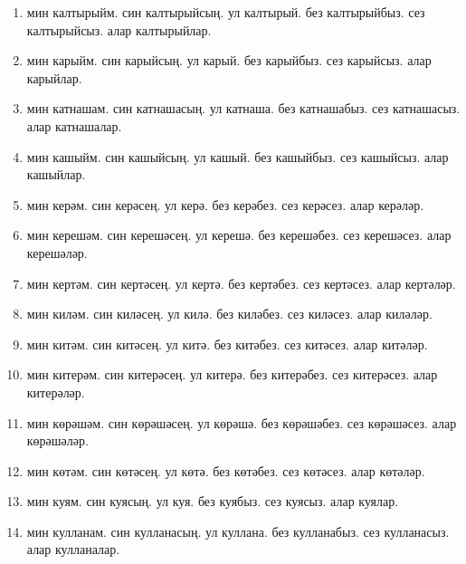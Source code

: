\documentclass{article}
\begin{document}
\begin{enumerate}
    \item
    мин калтырыйм.
    син калтырыйсың.
    ул калтырый.
    без калтырыйбыз.
    сез калтырыйсыз.
    алар калтырыйлар.

    \item
    мин карыйм.
    син карыйсың.
    ул карый.
    без карыйбыз.
    сез карыйсыз.
    алар карыйлар.

    \item
    мин катнашам.
    син катнашасың.
    ул катнаша.
    без катнашабыз.
    сез катнашасыз.
    алар катнашалар.

    \item
    мин кашыйм.
    син кашыйсың.
    ул кашый.
    без кашыйбыз.
    сез кашыйсыз.
    алар кашыйлар.

    \item
    мин керәм.
    син керәсең.
    ул керә.
    без керәбез.
    сез керәсез.
    алар керәләр.

    \item
    мин керешәм.
    син керешәсең.
    ул керешә.
    без керешәбез.
    сез керешәсез.
    алар керешәләр.

    \item
    мин кертәм.
    син кертәсең.
    ул кертә.
    без кертәбез.
    сез кертәсез.
    алар кертәләр.

    \item
    мин киләм.
    син киләсең.
    ул килә.
    без киләбез.
    сез киләсез.
    алар киләләр.

    \item
    мин китәм.
    син китәсең.
    ул китә.
    без китәбез.
    сез китәсез.
    алар китәләр.

    \item
    мин китерәм.
    син китерәсең.
    ул китерә.
    без китерәбез.
    сез китерәсез.
    алар китерәләр.

    \item
    мин көрәшәм.
    син көрәшәсең.
    ул көрәшә.
    без көрәшәбез.
    сез көрәшәсез.
    алар көрәшәләр.

    \item
    мин көтәм.
    син көтәсең.
    ул көтә.
    без көтәбез.
    сез көтәсез.
    алар көтәләр.

    \item
    мин куям.
    син куясың.
    ул куя.
    без куябыз.
    сез куясыз.
    алар куялар.

    \item
    мин кулланам.
    син кулланасың.
    ул куллана.
    без кулланабыз.
    сез кулланасыз.
    алар кулланалар.


\end{enumerate}
\end{document}

